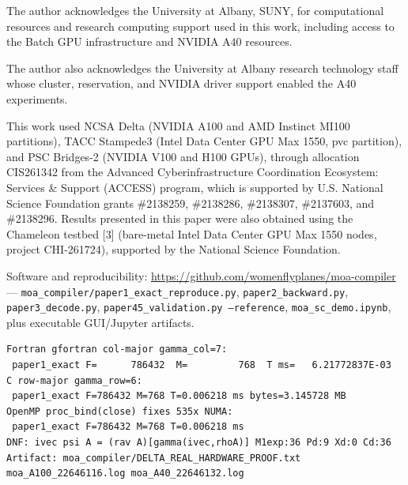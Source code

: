\begin{acknowledgments}

The author acknowledges the University at Albany, SUNY, for computational resources and research computing support used in this work, including access to the Batch GPU infrastructure and NVIDIA A40 resources.

The author also acknowledges the University at Albany research technology staff whose cluster, reservation, and NVIDIA driver support enabled the A40 experiments.

This work used NCSA Delta (NVIDIA A100 and AMD Instinct MI100 partitions), TACC Stampede3 (Intel Data Center GPU Max 1550, pvc partition), and PSC Bridges-2 (NVIDIA V100 and H100 GPUs), through allocation CIS261342 from the Advanced Cyberinfrastructure Coordination Ecosystem: Services \& Support (ACCESS) program, which is supported by U.S. National Science Foundation grants \#2138259, \#2138286, \#2138307, \#2137603, and \#2138296. Results presented in this paper were also obtained using the Chameleon testbed [3] (bare-metal Intel Data Center GPU Max 1550 nodes, project CHI-261724), supported by the National Science Foundation.

Software and reproducibility: \url{https://github.com/womenflyplanes/moa-compiler} --- \texttt{moa\_compiler/paper1\_exact\_reproduce.py}, \texttt{paper2\_backward.py}, \texttt{paper3\_decode.py}, \texttt{paper45\_validation.py --reference}, \texttt{moa\_sc\_demo.ipynb}, plus executable GUI/Jupyter artifacts.

\end{acknowledgments}


\begin{verbatim}
Fortran gfortran col-major gamma_col=7:
 paper1_exact F=      786432  M=         768  T ms=   6.21772837E-03
C row-major gamma_row=6:
 paper1_exact F=786432 M=768 T=0.006218 ms bytes=3.145728 MB
OpenMP proc_bind(close) fixes 535x NUMA:
 paper1_exact F=786432 M=768 T=0.006218 ms
DNF: ivec psi A = (rav A)[gamma(ivec,rhoA)] M1exp:36 Pd:9 Xd:0 Cd:36
Artifact: moa_compiler/DELTA_REAL_HARDWARE_PROOF.txt moa_A100_22646116.log moa_A40_22646132.log
\end{verbatim}


